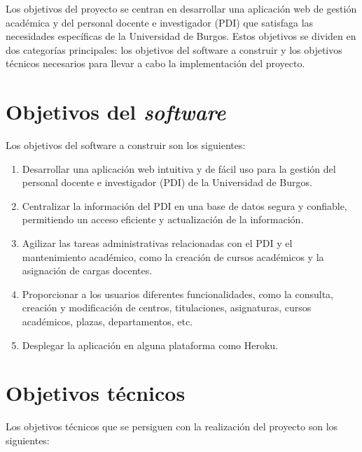 
Los objetivos del proyecto se centran en desarrollar una aplicación web de gestión académica y del personal docente e investigador (PDI) que satisfaga las necesidades específicas de la Universidad de Burgos. Estos objetivos se dividen en dos categorías principales: los objetivos del software a construir y los objetivos técnicos necesarios para llevar a cabo la implementación del proyecto.

\section{Objetivos del \textit{software}}

Los objetivos del software a construir son los siguientes:

\begin{enumerate}
  \item Desarrollar una aplicación web intuitiva y de fácil uso para la gestión del personal docente e investigador (PDI) de la Universidad de Burgos.
  \item Centralizar la información del PDI en una base de datos segura y confiable, permitiendo un acceso eficiente y actualización de la información.
  \item Agilizar las tareas administrativas relacionadas con el PDI y el mantenimiento académico, como la creación de cursos académicos y la asignación de cargas docentes.
  \item Proporcionar a los usuarios diferentes funcionalidades, como la consulta, creación y modificación de centros, titulaciones, asignaturas, cursos académicos, plazas, departamentos, etc.
  \item Desplegar la aplicación en alguna plataforma como Heroku.
\end{enumerate}

\section{Objetivos técnicos}

Los objetivos técnicos que se persiguen con la realización del proyecto son los siguientes:

